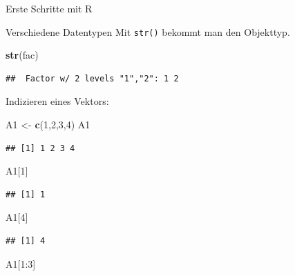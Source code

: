\documentclass[ignorenonframetext,]{beamer}
\newenvironment{Shaded}{}{}
\newcommand{\KeywordTok}[1]{\textcolor[rgb]{0.00,0.44,0.13}{\textbf{{#1}}}}
\newcommand{\DecValTok}[1]{\textcolor[rgb]{0.25,0.63,0.44}{{#1}}}
\newcommand{\StringTok}[1]{\textcolor[rgb]{0.25,0.44,0.63}{{#1}}}
\newcommand{\NormalTok}[1]{{#1}}
\begin{document}
\begin{frame}[fragile]{Erste Schritte mit R}
\begin{block}{Verschiedene Datentypen}
Mit \texttt{str()} bekommt man den Objekttyp.

\begin{Shaded}
\begin{Highlighting}[]
\KeywordTok{str}\NormalTok{(fac)}
\end{Highlighting}
\end{Shaded}

\begin{verbatim}
##  Factor w/ 2 levels "1","2": 1 2
\end{verbatim}

\end{block}

\begin{block}{Indizieren eines Vektors:}

\begin{Shaded}
\begin{Highlighting}[]
\NormalTok{A1 <-}\StringTok{ }\KeywordTok{c}\NormalTok{(}\DecValTok{1}\NormalTok{,}\DecValTok{2}\NormalTok{,}\DecValTok{3}\NormalTok{,}\DecValTok{4}\NormalTok{)}
\NormalTok{A1}
\end{Highlighting}
\end{Shaded}

\begin{verbatim}
## [1] 1 2 3 4
\end{verbatim}

\begin{Shaded}
\begin{Highlighting}[]
\NormalTok{A1[}\DecValTok{1}\NormalTok{]}
\end{Highlighting}
\end{Shaded}

\begin{verbatim}
## [1] 1
\end{verbatim}

\begin{Shaded}
\begin{Highlighting}[]
\NormalTok{A1[}\DecValTok{4}\NormalTok{]}
\end{Highlighting}
\end{Shaded}

\begin{verbatim}
## [1] 4
\end{verbatim}

\begin{Shaded}
\begin{Highlighting}[]
\NormalTok{A1[}\DecValTok{1}\NormalTok{:}\DecValTok{3}\NormalTok{]}
\end{Highlighting}
\end{Shaded}


\end{block}
\end{frame}
\end{document}
